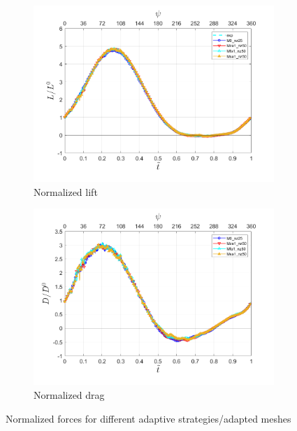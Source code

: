 \begin{figure}[H]
\centering

\begin{subfigure}[b]{0.7\textwidth}
\centering
\includegraphics[width=1\textwidth]{figures/Results/Lift_adapt_strat.png}
\caption{Normalized lift}
\label{fig:lift_plot}
\end{subfigure}
\begin{subfigure}[b]{0.7\textwidth}
\centering
\includegraphics[width=1\textwidth]{figures/Results/Drag_adapt_strat.png}
\caption{Normalized drag}
\label{fig:drag_plot}
\end{subfigure}

\label{fig:force_response_adapt}
\caption{Normalized forces for different adaptive strategies/adapted meshes}
\end{figure}

